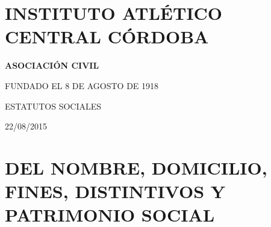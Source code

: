 \documentclass[]{book}
\title{}
\author{}
\date{}
\begin{document}
{
\setcounter{tocdepth}{1}
\tableofcontents
}
\hypertarget{instituto-atletico-central-cordoba}{%
\chapter*{INSTITUTO ATLÉTICO CENTRAL CÓRDOBA}\label{instituto-atletico-central-cordoba}}

\textbf{ASOCIACIÓN CIVIL}

FUNDADO EL 8 DE AGOSTO DE 1918

ESTATUTOS SOCIALES

22/08/2015

\hypertarget{cap1}{%
\chapter{DEL NOMBRE, DOMICILIO, FINES, DISTINTIVOS Y PATRIMONIO SOCIAL}\label{cap1}}
\end{document}
